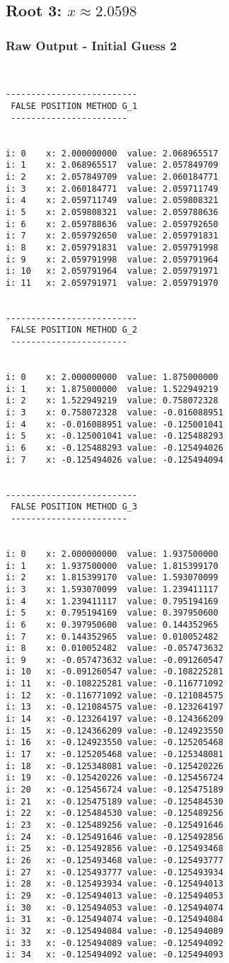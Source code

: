 \documentclass[11pt]{article} %
\begin{document}
\subsection*{Root 3: $x \approx 2.0598$}
\subsubsection*{Raw Output - Initial Guess 2}
\begin{verbatim}
 

--------------------------
 FALSE POSITION METHOD G_1
 -----------------------


i: 0	x: 2.000000000	value: 2.068965517
i: 1	x: 2.068965517	value: 2.057849709
i: 2	x: 2.057849709	value: 2.060184771
i: 3	x: 2.060184771	value: 2.059711749
i: 4	x: 2.059711749	value: 2.059808321
i: 5	x: 2.059808321	value: 2.059788636
i: 6	x: 2.059788636	value: 2.059792650
i: 7	x: 2.059792650	value: 2.059791831
i: 8	x: 2.059791831	value: 2.059791998
i: 9	x: 2.059791998	value: 2.059791964
i: 10	x: 2.059791964	value: 2.059791971
i: 11	x: 2.059791971	value: 2.059791970


--------------------------
 FALSE POSITION METHOD G_2
 -----------------------


i: 0	x: 2.000000000	value: 1.875000000
i: 1	x: 1.875000000	value: 1.522949219
i: 2	x: 1.522949219	value: 0.758072328
i: 3	x: 0.758072328	value: -0.016088951
i: 4	x: -0.016088951	value: -0.125001041
i: 5	x: -0.125001041	value: -0.125488293
i: 6	x: -0.125488293	value: -0.125494026
i: 7	x: -0.125494026	value: -0.125494094


--------------------------
 FALSE POSITION METHOD G_3
 -----------------------


i: 0	x: 2.000000000	value: 1.937500000
i: 1	x: 1.937500000	value: 1.815399170
i: 2	x: 1.815399170	value: 1.593070099
i: 3	x: 1.593070099	value: 1.239411117
i: 4	x: 1.239411117	value: 0.795194169
i: 5	x: 0.795194169	value: 0.397950600
i: 6	x: 0.397950600	value: 0.144352965
i: 7	x: 0.144352965	value: 0.010052482
i: 8	x: 0.010052482	value: -0.057473632
i: 9	x: -0.057473632	value: -0.091260547
i: 10	x: -0.091260547	value: -0.108225281
i: 11	x: -0.108225281	value: -0.116771092
i: 12	x: -0.116771092	value: -0.121084575
i: 13	x: -0.121084575	value: -0.123264197
i: 14	x: -0.123264197	value: -0.124366209
i: 15	x: -0.124366209	value: -0.124923550
i: 16	x: -0.124923550	value: -0.125205468
i: 17	x: -0.125205468	value: -0.125348081
i: 18	x: -0.125348081	value: -0.125420226
i: 19	x: -0.125420226	value: -0.125456724
i: 20	x: -0.125456724	value: -0.125475189
i: 21	x: -0.125475189	value: -0.125484530
i: 22	x: -0.125484530	value: -0.125489256
i: 23	x: -0.125489256	value: -0.125491646
i: 24	x: -0.125491646	value: -0.125492856
i: 25	x: -0.125492856	value: -0.125493468
i: 26	x: -0.125493468	value: -0.125493777
i: 27	x: -0.125493777	value: -0.125493934
i: 28	x: -0.125493934	value: -0.125494013
i: 29	x: -0.125494013	value: -0.125494053
i: 30	x: -0.125494053	value: -0.125494074
i: 31	x: -0.125494074	value: -0.125494084
i: 32	x: -0.125494084	value: -0.125494089
i: 33	x: -0.125494089	value: -0.125494092
i: 34	x: -0.125494092	value: -0.125494093


\end{verbatim}
\end{document}
